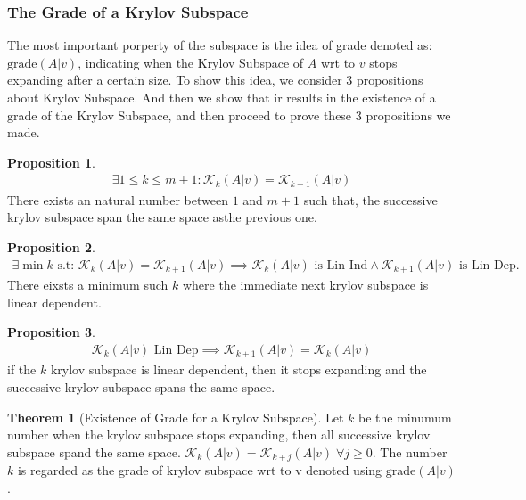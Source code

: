 \documentclass[]{article}
\theoremstyle{definition}
\newtheorem{theorem}{Theorem}
\newtheorem{prop}{Proposition}
\begin{document}
        \subsubsection{The Grade of a Krylov Subspace}
            The most important porperty of the subspace is the idea of grade denoted as: $\text{grade}(A|v)$, indicating when the Krylov Subspace of $A$ wrt to $v$ stops expanding after a certain size. To show this idea, we consider 3 propositions about Krylov Subspace. And then we show that ir results in the existence of a grade of the Krylov Subspace, and then proceed to prove these 3 propositions we made. 
            \begin{prop}
                \begin{align}
                    \exists 1 \le k \le m + 1: \mathcal K_k(A|v) = \mathcal K_{k + 1}(A|v)
                \end{align}
                There exists an natural number between $1$ and $m+ 1$ such that, the successive krylov subspace span the same space asthe previous one. 
            \end{prop} 
            \begin{prop}
                \begin{align}
                    \exists \min k \text{ s.t: }\mathcal K_k(A|v) = \mathcal K_{k + 1}(A|v) \implies 
                    \mathcal K_k(A|v) \text{ is Lin Ind} \wedge \mathcal K_{k + 1}(A|v) \text{ is Lin Dep}. 
                \end{align}
                There eixsts a minimum such $k$ where the immediate next krylov subspace is linear dependent. 
            \end{prop}
            \begin{prop}
                \begin{align}
                    \mathcal K_k(A|v) \text{ Lin Dep} \implies \mathcal K_{k + 1}(A|v) = \mathcal K_k(A|v)
                \end{align}
                if the $k$ krylov subspace is linear dependent, then it stops expanding and the successive krylov subspace spans the same space. 
            \end{prop}
            \begin{theorem}[Existence of Grade for a Krylov Subspace]
                Let $k$ be the minumum number when the krylov subspace stops expanding, then all successive krylov subspace spand the same space. $\mathcal K_k(A|v) = \mathcal K_{k + j}(A|v) \;\forall j \ge 0$. The number $k$ is regarded as the grade of krylov subspace wrt to v denoted using $\text{grade}(A|v)$. 
            \end{theorem}
\end{document}
